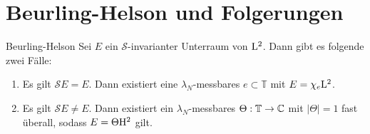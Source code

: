 \section{Beurling-Helson und Folgerungen}

\begin{genericthm}{Beurling-Helson}\label{skript:1.1}
Sei $E$ ein $\mathscr{S}$-invarianter Unterraum von $\mathrm{L}^2$.
Dann gibt es folgende zwei Fälle:
\begin{enumerate}[label=\textbf{(\arabic*)}]
\item
Es gilt $\mathscr{S} E = E$.
Dann existiert eine $\lambda_N$-messbares $e \subset \mathbb{T}$ mit $E = \chi_e \mathrm{L}^2$.
\item
Es gilt $\mathscr{S} E \neq E$.
Dann existiert ein $\lambda_N$-messbares $\Theta : \mathbb{T} \to \mathbb{C}$ mit $|\Theta| = 1$ fast überall, sodass
$E = \Theta \mathrm{H}^2$ gilt.
\end{enumerate}
\end{genericthm}

